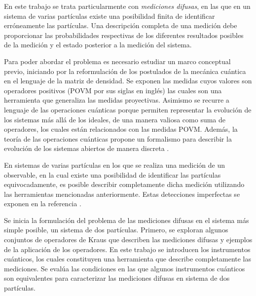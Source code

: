 \documentclass[12pt,oneside]{book}\raggedbottom{} %
\begin{document}
\begin{sloppypar}
{{





 En este trabajo se trata particularmente
con \textit{mediciones difusas}, en las que en un sistema de varias partículas
existe una posibilidad finita de identificar erróneamente las partículas. Una descripción completa de una medición debe proporcionar las probabilidades respectivas de los diferentes resultados posibles de la medición y el estado posterior a la medición del sistema.





Para poder abordar el problema es necesario estudiar un marco conceptual
previo, iniciando por la reformulación de los postulados de la mecánica
cuántica en el lenguaje de la matriz de densidad. Se exponen las medidas cuyos
valores son operadores positivos (POVM por sus siglas en inglés) las cuales son
una herramienta que generaliza las medidas proyectivas. Asimismo se recurre a
lenguaje de las operaciones cuánticas porque permiten representar la evolución
de los sistemas más allá de los ideales, de una manera valiosa como suma de
operadores, los cuales están relacionados con las medidas POVM\@. Además, la
teoría de las operaciones cuánticas propone un formalismo para describir la
evolución de los sistemas abiertos de manera discreta
{\cite{nielsen_chuang_2010}}.

En sistemas de varias partículas en los que se realiza una medición de un
observable, en la cual existe una posibilidad de identificar las partículas
equivocadamente, es posible describir completamente dicha medición utilizando
las herramientas mencionadas anteriormente. Estas detecciones imperfectas se
exponen en la referencia {\cite{Pineda_2021}}.


Se inicia la formulación del problema de las mediciones difusas en el sistema
más simple posible, un sistema de dos partículas. Primero, se exploran algunos
conjuntos de operadores de Kraus que describen las mediciones difusas y
ejemplos  de la aplicación de los operadores. En este trabajo se
introducen los instrumentos cuánticos, los cuales constituyen una herramienta
que describe completamente las mediciones. Se evalúa las condiciones en las que
algunos instrumentos cuánticos son equivalentes para caracterizar las
mediciones difusas en sistema de dos partículas.

}}
\end{sloppypar}
\end{document}
